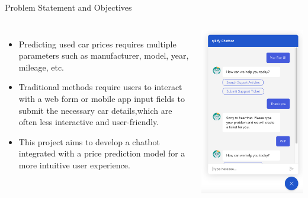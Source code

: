 \documentclass{beamer}
\begin{document}
\begin{frame}[t]{Problem Statement and Objectives}
    \begin{columns}
        \begin{itemize}
        \item Predicting used car prices requires multiple parameters such as manufacturer, model, year, mileage, etc.
        \item Traditional methods require users to interact with a web form or mobile app input fields to submit the necessary car details,which are often less interactive and user-friendly.
        \item This project aims to develop a chatbot integrated with a price prediction model for a more intuitive user experience.
        \end{itemize}
        
        \centering
        \includegraphics[width=\linewidth]{interface.png}  %
    \end{columns}
\end{frame}
\end{document}
